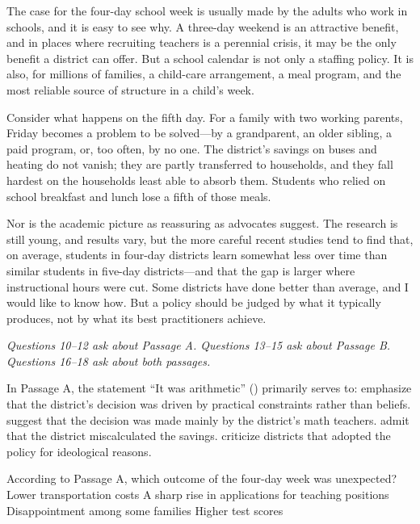 \documentclass[11pt]{article}
\begin{document}
\begin{passage}[cont]
The case for the four-day school week is usually made by the adults who work in schools, and it is easy to see why. A three-day weekend is an attractive benefit, and in places where recruiting teachers is a perennial crisis, it may be the only benefit a district can offer. But a school calendar is not only a staffing policy. It is also, for millions of families, a child-care arrangement, a meal program, and the most reliable source of structure in a child's week.

Consider what happens on the fifth day. For a family with two working parents, Friday becomes a problem to be solved---by a grandparent, an older sibling, a paid program, or, too often, by no one. The district's savings on buses and heating do not vanish; they are partly transferred to households, and they fall hardest on the households least able to absorb them. Students who relied on school breakfast and lunch lose a fifth of those meals.

Nor is the academic picture as reassuring as advocates suggest. The research is still young, and results vary, but the more careful recent studies tend to find that, on average, students in four-day districts learn somewhat less over time than similar students in five-day districts---and that the gap is larger where instructional hours were cut. Some districts have done better than average, and I would like to know how. But a policy should be judged by what it typically produces, not by what its best practitioners achieve.
\end{passage}

{\small\itshape Questions 10--12 ask about Passage A. Questions 13--15 ask about Passage B. Questions 16--18 ask about both passages.}

{In Passage A, the statement ``It was arithmetic'' () primarily serves to:}
{emphasize that the district's decision was driven by practical constraints rather than beliefs.}
{suggest that the decision was made mainly by the district's math teachers.}
{admit that the district miscalculated the savings.}
{criticize districts that adopted the policy for ideological reasons.}

{According to Passage A, which outcome of the four-day week was unexpected?}
{Lower transportation costs}
{A sharp rise in applications for teaching positions}
{Disappointment among some families}
{Higher test scores}
\end{document}
